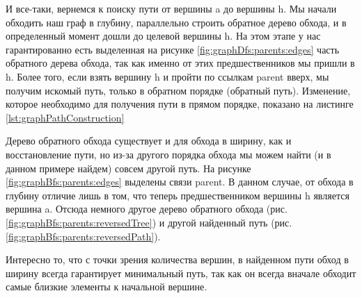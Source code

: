 \documentclass[../../article.tex]{subfiles}
\begin{document}
И все-таки, вернемся к поиску пути от вершины {\firacodebold a} до вершины {\firacodebold h}. Мы начали обходить наш граф в глубину, параллельно строить обратное дерево обхода, и в определенный момент дошли до целевой вершины {\firacodebold h}. На этом этапе у нас гарантированно есть выделенная на рисунке \ref{fig:graphDfs:parents:edges} часть обратного дерева обхода, так как именно от этих предшественников мы пришли в {\firacodebold h}. Более того, если взять вершину {\firacodebold h} и пройти по ссылкам {\firacodebold parent} вверх, мы получим искомый путь, только в обратном порядке (обратный путь). Изменение, которое необходимо для получения пути в прямом порядке, показано на листинге \ref{lst:graphPathConstruction}

Дерево обратного обхода существует и для обхода в ширину, как и восстановление пути, но из-за другого порядка обхода мы можем найти (и в данном примере найдем) совсем другой путь. На рисунке \ref{fig:graphBfs:parents:edges} выделены связи {\firacodebold parent}. В данном случае, от обхода в глубину отличие лишь в том, что теперь предшественником вершины {\firacodebold h} является вершина {\firacodebold a}. Отсюда немного другое дерево обратного обхода (рис. \ref{fig:graphBfs:parents:reversedTree}) и другой найденный путь (рис. \ref{fig:graphBfs:parents:reversedPath}).

Интересно то, что с точки зрения количества вершин, в найденном пути обход в ширину всегда гарантирует минимальный путь, так как он всегда вначале обходит самые близкие элементы к начальной вершине.
\end{document}
